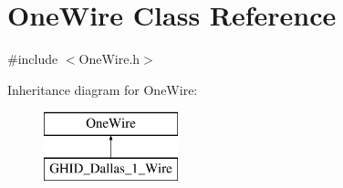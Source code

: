 \hypertarget{class_one_wire}{\section{\-One\-Wire \-Class \-Reference}
\label{class_one_wire}
}


{\ttfamily \#include $<$\-One\-Wire.\-h$>$}

\-Inheritance diagram for \-One\-Wire\-:\begin{figure}[H]
\begin{center}
\leavevmode
\includegraphics[height=2.000000cm]{class_one_wire}
\end{center}
\end{figure}
